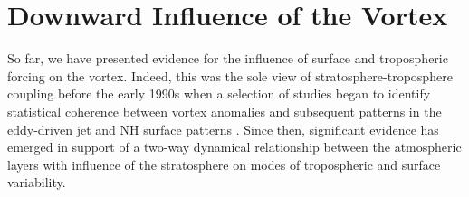 

\section{Downward Influence of the Vortex}
\label{sec:Downward_influence}
So far, we have presented evidence for the influence of surface and tropospheric forcing on the vortex. Indeed, this was the sole view of stratosphere-troposphere coupling before the early 1990s when a selection of studies began to identify statistical coherence between vortex anomalies and subsequent patterns in the eddy-driven jet and NH surface patterns \citep{koderaDownward1990a,nigamStructure1990}. Since then, significant evidence has emerged in support of a two-way dynamical relationship between the atmospheric layers with influence of the stratosphere on modes of tropospheric and surface variability.

